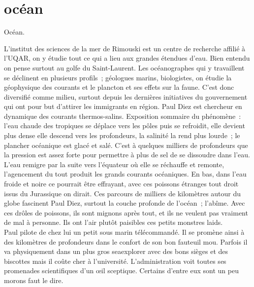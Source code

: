 \clearpage
\section*{océan}
Océan.

L’institut des sciences de la mer de Rimouski est un centre de recherche
affilié à l’UQAR, on y étudie tout ce qui a lieu aux grandes étendues d’eau.
Bien entendu on pense surtout au golfe du Saint-Laurent. Les océanographes qui
y travaillent se déclinent en plusieurs profils ; géologues marins,
biologistes, on étudie la géophysique des courants et le plancton et ses effets
sur la faune.  C’est donc diversifié comme milieu, surtout depuis les dernières
initiatives du gouvernement qui ont pour but d’attirer les immigrants en
région. Paul Diez est chercheur en dynamique des courants thermos-salins.
Exposition sommaire du phénomène : l’eau chaude des tropiques se déplace vers
les pôles puis se refroidit, elle devient plus dense elle descend vers les
profondeurs, la salinité la rend plus lourde ; le plancher océanique est glacé
et salé. C’est à quelques milliers de profondeurs que la pression est assez
forte pour permettre à plus de sel de se dissoudre dans l’eau.\\

L’eau remigre par la suite vers l’équateur où elle se réchauffe et remonte,
l’agencement du tout produit les grands courants océaniques. En bas, dans l’eau
froide et noire ce pourrait être effrayant, avec ces poissons étranges tout
droit issus du Jurassique on dirait. Ces parcours de milliers de kilomètres
autour du globe fascinent Paul Diez, surtout la couche profonde de l’océan ;
l’abîme. Avec ces drôles de poissons, ils sont mignons après tout, et ils ne
veulent pas vraiment de mal à personne. Ils ont l’air plutôt paisibles ces
petits monstres laids.\\

Paul pilote de chez lui un petit sous marin télécommandé. Il se promène ainsi à
des kilomètres de profondeurs dans le confort de son bon fauteuil mou. Parfois
il va physiquement dans un plus gros seaexplorer avec des bons sièges et des
biscottes mais il coûte cher à l’université. L’administration voit toutes ses
promenades scientifiques d’un œil sceptique. Certains d’entre eux sont un peu
morons faut le dire.  
